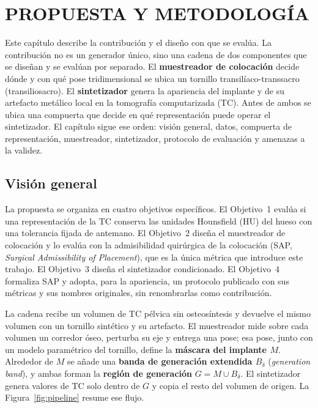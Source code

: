 \chapter{PROPUESTA Y METODOLOGÍA}\label{cap:propuesta}

Este capítulo describe la contribución y el diseño con que se evalúa. La contribución no es un generador único, sino una cadena de dos componentes que se diseñan y se evalúan por separado. El \textbf{muestreador de colocación} decide dónde y con qué pose tridimensional se ubica un tornillo transilíaco-transsacro (transiliosacro). El \textbf{sintetizador} genera la apariencia del implante y de su artefacto metálico local en la tomografía computarizada (TC). Antes de ambos se ubica una compuerta que decide en qué representación puede operar el sintetizador. El capítulo sigue ese orden: visión general, datos, compuerta de representación, muestreador, sintetizador, protocolo de evaluación y amenazas a la validez.

\section{Visión general}\label{sec:vision}

La propuesta se organiza en cuatro objetivos específicos. El Objetivo~1 evalúa si una representación de la TC conserva las unidades Hounsfield (HU) del hueso con una tolerancia fijada de antemano. El Objetivo~2 diseña el muestreador de colocación y lo evalúa con la admisibilidad quirúrgica de la colocación (SAP, \emph{Surgical Admissibility of Placement}), que es la única métrica que introduce este trabajo. El Objetivo~3 diseña el sintetizador condicionado. El Objetivo~4 formaliza SAP y adopta, para la apariencia, un protocolo publicado con sus métricas y sus nombres originales, sin renombrarlas como contribución.

La cadena recibe un volumen de TC pélvica sin osteosíntesis y devuelve el mismo volumen con un tornillo sintético y su artefacto. El muestreador mide sobre cada volumen un corredor óseo, perturba su eje y entrega una pose; esa pose, junto con un modelo paramétrico del tornillo, define la \textbf{máscara del implante $M$}. Alrededor de $M$ se añade una \textbf{banda de generación extendida $B_{\delta}$} (\emph{generation band}), y ambas forman la \textbf{región de generación} $G = M \cup B_{\delta}$. El sintetizador genera valores de TC solo dentro de $G$ y copia el resto del volumen de origen. La Figura~\ref{fig:pipeline} resume ese flujo.

